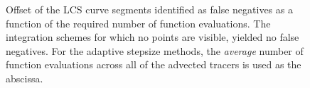 \begin{figure}[htpb]
    \centering
    
    \caption[Offset of the LCS curve segments identified as false negatives,
    as a function of the required number of function evaluations]
    {Offset of the LCS curve segments identified as false negatives as a
        function of the required number of function evaluations. The
        integration schemes for which no points are visible, yielded
        no false negatives. For the adaptive stepsize methods, the
        \emph{average} number of function evaluations across all of the advected
    tracers is used as the abscissa.}
    \label{fig:lcs_err_fn_fn}
\end{figure}
